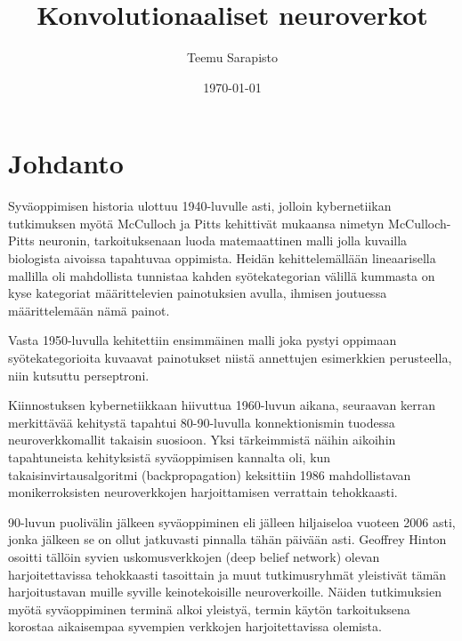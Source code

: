 \documentclass[finnish]{tktltiki2}
\title{Konvolutionaaliset neuroverkot}
\author{Teemu Sarapisto}
\date{\today}
\theoremstyle{definition}
\theoremstyle{remark}
\begin{document}

  \frontmatter      %

  \maketitle        %
  \makeabstract     %

  \tableofcontents  %


  \mainmatter       %

  \section{Johdanto}
   Syväoppimisen historia ulottuu 1940-luvulle asti, jolloin kybernetiikan tutkimuksen myötä McCulloch ja Pitts kehittivät mukaansa nimetyn McCulloch-Pitts neuronin, tarkoituksenaan luoda matemaattinen malli jolla kuvailla biologista aivoissa tapahtuvaa oppimista. Heidän kehittelemällään lineaarisella mallilla oli mahdollista tunnistaa kahden syötekategorian välillä kummasta on kyse kategoriat määrittelevien painotuksien avulla, ihmisen joutuessa määrittelemään nämä painot.

  Vasta 1950-luvulla kehitettiin ensimmäinen malli joka pystyi oppimaan syötekategorioita kuvaavat painotukset niistä annettujen esimerkkien perusteella, niin kutsuttu perseptroni.

  Kiinnostuksen kybernetiikkaan hiivuttua 1960-luvun aikana, seuraavan kerran merkittävää kehitystä tapahtui 80-90-luvulla konnektionismin tuodessa neuroverkkomallit takaisin suosioon. Yksi tärkeimmistä näihin aikoihin tapahtuneista kehityksistä syväoppimisen kannalta oli, kun takaisinvirtausalgoritmi (backpropagation) keksittiin 1986 mahdollistavan monikerroksisten neuroverkkojen harjoittamisen verrattain tehokkaasti.

  90-luvun puolivälin jälkeen syväoppiminen eli jälleen hiljaiseloa vuoteen 2006 asti, jonka jälkeen se on ollut jatkuvasti pinnalla tähän päivään asti. Geoffrey Hinton osoitti tällöin syvien uskomusverkkojen (deep belief network) olevan harjoitettavissa tehokkaasti tasoittain ja muut tutkimusryhmät yleistivät tämän harjoitustavan muille syville keinotekoisille neuroverkoille. Näiden tutkimuksien myötä syväoppiminen terminä alkoi yleistyä, termin käytön tarkoituksena korostaa aikaisempaa syvempien verkkojen harjoitettavissa olemista.
\end{document}
